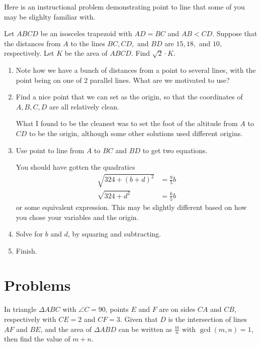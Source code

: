 \documentclass[mast]{lucky}
\begin{document}
Here is an instructional problem demonstrating point to line that some of you may be slighlty familiar with. 
\begin{exam}[AIME I 2021/9]
Let $ABCD$ be an isosceles trapezoid with $AD=BC$ and $AB<CD.$ Suppose that the distances from $A$ to the lines $BC,CD,$ and $BD$ are $15,18,$ and $10,$ respectively. Let $K$ be the area of $ABCD.$ Find $\sqrt2 \cdot K.$
\end{exam}

\begin{walk}

\begin{enumerate}
    \item Note how we have a bunch of distances from a point to several lines, with the point being on one of 2 parallel lines. What are we motivated to use?
    \item Find a nice point that we can set as the origin, so that the coordinates of $A,B,C,D$ are all relatively clean.
    
    What I found to be the cleanest was to set the foot of the altitude from $A$ to $CD$ to be the origin, although some other solutions used different origins. 
    
    \item Use point to line from $A$ to $BC$ and $BD$ to get two equations.
    
    You should have gotten the quadratics 
    \begin{align*}
        \sqrt{324+(b+d)^2}&=\frac{9}{5}b\\
        \sqrt{324+d^2}&=\frac{6}{5}b
    \end{align*}
    or some equivalent expression. This may be slightly different based on how you chose your variables and the origin. 
    \item Solve for $b$ and $d$, by squaring and subtracting. 
    \item Finish. 
\end{enumerate}

\end{walk}

\pagebreak
\section{Problems}



\begin{prob}[MATHCOUNTS 2008]{2}
In triangle $\Delta ABC$ with $\angle C = 90$, points $E$ and $F$ are on sides $CA$ and $CB$, respectively with $CE=2$ and $CF=3$. Given that $D$ is the intersection of lines $AF$ and $BE$, and the area of $\Delta ABD$ can be written as $\frac{m}{n}$ with $\gcd(m,n)=1$, then find the value of $m+n$.
\end{prob}
\end{document}
